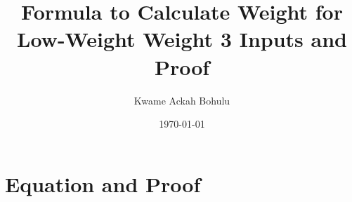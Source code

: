 \documentclass[11pt, oneside, dvipdfmx]{book}
\title{Formula to Calculate Weight for Low-Weight Weight 3 Inputs and Proof}
\author{Kwame Ackah Bohulu}
\date{\today}
\begin{document}
\maketitle

\newpage


\section{Equation and Proof}
\end{document}
